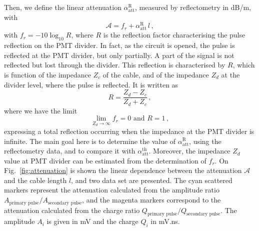 Then, we define the linear attenuation $\alpha_{\text{att}}^{\text{R}}$, measured by reflectometry in dB/m, with
\begin{equation}
  \mathcal{A} = f_{r}+\alpha_{\text{att}}^{\text{R}}\,l\,,
\end{equation}
with $f_{r} = -10\log_{10}R$, where $R$ is the reflection factor characterising the pulse reflection on the PMT divider.
In fact, as the circuit is opened, the pulse is reflected at the PMT divider, but only partially.
A part of the signal is not reflected but lost through the divider.
This reflection is characterised by $R$, which is function of the impedance $Z_{c}$ of the cable, and of the impedance $Z_{d}$ at the divider level, where the pulse is reflected.
It is written as
\begin{equation}
  R = \frac{Z_{d}-Z_{c}}{Z_{d}+Z_{c}}\,,
\end{equation}
where we have the limit
\begin{equation}
  \lim_{Z_{d} \to \infty} f_{r} = 0 \text{ and } R=1\,,
\end{equation}
expressing a total reflection occurring when the impedance at the PMT divider is infinite.
The main goal here is to determine the value of $\alpha_{\text{att}}^{\text{R}}$, using the reflectometry data, and to compare it with $\alpha_{\text{att}}^{\text{th}}$.
Moreover, the impedance $Z_{d}$ value at PMT divider can be estimated from the determination of $f_{r}$.
On Fig.~\ref{fig:attenuation} is shown the linear dependence between the attenuation $\mathcal{A}$ and the cable length $l$, and two data set are presented.
The cyan scattered markers represent the attenuation calculated from the amplitude ratio $A_{\text{primary pulse}}/A_{\text{secondary pulse}}$, and the magenta markers correspond to the attenuation calculated from the charge ratio $Q_{\text{primary pulse}}/Q_{\text{secondary pulse}}$.
The amplitude $A_{i}$ is given in mV and the charge $Q_{i}$ in mV.ns.
